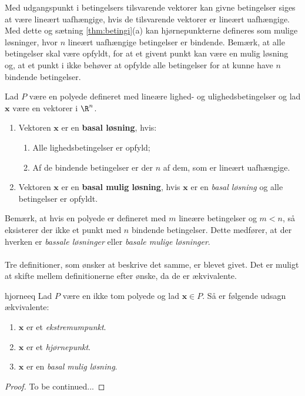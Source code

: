 %
Med udgangspunkt i betingelsers tilsvarende vektorer kan givne betingelser siges at være lineært uafhængige, hvis de tilsvarende vektorer er lineært uafhængige.
Med dette og sætning \ref{thm:betingi}(a) kan hjørnepunkterne defineres som mulige løsninger, hvor $n$ lineært uafhængige betingelser er bindende.
Bemærk, at alle betingelser skal være opfyldt, for at et givent punkt kan være en mulig løsning og, at et punkt i ikke behøver at opfylde alle betingelser for at kunne have $n$ bindende betingelser.
%
\begin{defn}{}{}
Lad $P$ være en polyede defineret med lineære lighed- og ulighedsbetingelser og lad $\textbf{x}$ være en vektorer i $\R^n$.
%
\begin{enumerate}[label=(\alph*)]
\item Vektoren $\textbf{x}$ er en \textbf{basal løsning}, hvis:
%
\begin{enumerate}[label=(\roman*)]
\item Alle lighedsbetingelser er opfyld;
\item Af de bindende betingelser er der $n$ af dem, som er lineært uafhængige.
\end{enumerate}
%
\item Vektoren $\textbf{x}$ er en \textbf{basal mulig løsning}, hvis $\textbf{x}$ er en \textit{basal løsning} og alle betingelser er opfyldt.
\end{enumerate}
\end{defn}
%
Bemærk, at hvis en polyede er defineret med $m$ lineære betingelser og $m<n$, så eksisterer der ikke et punkt med $n$ bindende betingelser.
Dette medfører, at der hverken er \textit{bassale løsninger} eller \textit{basale mulige løsninger}.\\\\
%
Tre definitioner, som ønsker at beskrive det samme, er blevet givet.
Det er muligt at skifte mellem definitionerne efter ønske, da de er ækvivalente.
%
\begin{thm}{}{hjorneeq}
Lad $P$ være en ikke tom polyede og lad $\textbf{x}\in P$.
Så er følgende udsagn ækvivalente:
%
\begin{enumerate}[label=(\alph*)]
\item $\textbf{x}$ er et \textit{ekstremumpunkt}.
\item $\textbf{x}$ er et \textit{hjørnepunkt}.
\item $\textbf{x}$ er en \textit{basal mulig løsning}.
\end{enumerate}
%
\end{thm}
%
\begin{proof}
To be continued...
\end{proof}